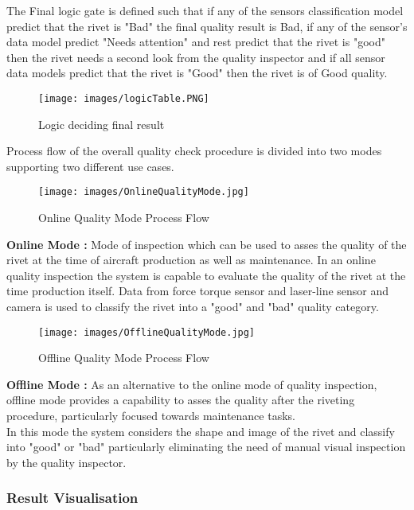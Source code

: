 \documentclass{article}
\begin{document}
The Final logic gate is defined such that if any of the sensors classification model predict that the rivet is "Bad" the final quality result is Bad, if any of the sensor's data model predict "Needs attention" and rest predict that the rivet is "good" then the rivet needs a second look from the quality inspector and if all sensor data models predict that the rivet is "Good" then the rivet is of Good quality.


\begin{figure}[H]
    \centering
    \texttt{[image: images/logicTable.PNG]}
    \caption{Logic deciding final result}
    \label{fig:finalResultLogic}
\end{figure}


Process flow of the overall quality check procedure is divided into two modes supporting two different use cases.



\begin{figure}[H]
    \centering
    \texttt{[image: images/OnlineQualityMode.jpg]}
    \caption{Online Quality Mode Process Flow}
    \label{fig:OnlineQualityModeProcessFlow}
\end{figure}

\textbf{Online Mode :} Mode of inspection which can be used to asses the quality of the rivet at the time of aircraft production as well as maintenance. In an online quality inspection the system is capable to evaluate the quality of the rivet at the time production itself. Data from force torque sensor and laser-line sensor and camera is used to classify the rivet into a "good" and "bad" quality category.

\begin{figure}[H]
    \centering
    \texttt{[image: images/OfflineQualityMode.jpg]}
    \caption{Offline Quality Mode Process Flow}
    \label{fig:OfflineQualityModeProcessFlow}
\end{figure}

\textbf{Offline Mode :} As an alternative to the online mode of quality inspection, offline mode provides a capability to asses the quality after the riveting procedure, particularly focused towards maintenance tasks.\\ 
In this mode the system considers the shape and image of the rivet and classify into "good" or "bad" particularly eliminating the need of manual visual inspection by the quality inspector.


\subsubsection{Result Visualisation}
\end{document}
